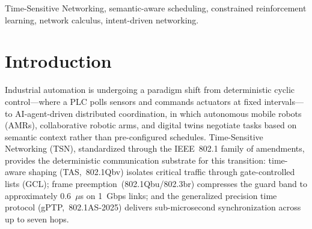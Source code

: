 \documentclass[conference]{IEEEtran}
\begin{document}
\begin{abstract}
Evaluated on a 3-switch line topology with a 10\,ms hyperperiod under three experiment modes---static benchmark (5/8/12 flows), dynamic flow arrival (5 base + 3 arriving), and component ablation---the CSRL scheduler achieves 100\% task completion at 5 and 8 flows and 97.5\% at 12 flows (92.8\% $\pm$ 3.6\% across three seeds), close to a static greedy GCL baseline that achieves 100\% in all static scenarios. The Lagrangian multiplier $\lambda$, which couples the Network Calculus constraint into the learning objective, rises monotonically with flow density (0.12 at 5 flows to 0.67 at 12 flows), demonstrating that the formal constraint pressure is genuinely transmitted into the learned policy. Ablation studies confirm the Lagrangian mechanism is active (Full CSRL $\lambda=0.29$ vs. constraint-disabled $\lambda\equiv 0$) and that semantic weighting activates the constraint term more strongly (No-Semantic $\lambda=0.10$). These results establish a semantically-aware, formally-verifiable RL scheduling architecture whose performance is competitive with classical schedulers while retaining online adaptability.

\end{abstract}

\begin{IEEEkeywords}
Time-Sensitive Networking, semantic-aware scheduling, constrained reinforcement learning, network calculus, intent-driven networking.
\end{IEEEkeywords}

\section{Introduction}

Industrial automation is undergoing a paradigm shift from deterministic cyclic control---where a PLC polls sensors and commands actuators at fixed intervals---to AI-agent-driven distributed coordination, in which autonomous mobile robots (AMRs), collaborative robotic arms, and digital twins negotiate tasks based on semantic context rather than pre-configured schedules. Time-Sensitive Networking (TSN), standardized through the IEEE~802.1 family of amendments, provides the deterministic communication substrate for this transition: time-aware shaping (TAS,~802.1Qbv) isolates critical traffic through gate-controlled lists (GCL); frame preemption~(802.1Qbu/802.3br) compresses the guard band to approximately 0.6~$\mu$s on 1~Gbps links; and the generalized precision time protocol (gPTP,~802.1AS-2025) delivers sub-microsecond synchronization across up to seven hops.
\end{document}
